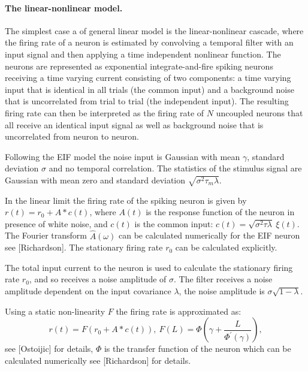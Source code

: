 \documentclass[%
 reprint,
 amsmath,amssymb,
 aps,
floatfix,
]{revtex4-1}
\begin{document}
\paragraph*{The linear-nonlinear model.}
The simplest case a of general linear model is the linear-nonlinear cascade, where the firing rate of a neuron is estimated by convolving a temporal filter with an input signal and then applying a time independent nonlinear function. The neurons are represented as exponential integrate-and-fire spiking neurons receiving a time varying current consisting of two components: a time varying input that is identical in all trials (the common input) and a background noise that is uncorrelated from trial to trial (the independent input). The resulting firing rate can then be interpreted as the firing rate of $N$ uncoupled neurons that all receive an identical input signal as well as background noise that is uncorrelated from neuron to neuron. 

Following the EIF model the noise input is Gaussian with mean $\gamma$, standard deviation $\sigma$ and no temporal correlation. The statistics of the stimulus signal are Gaussian with mean zero and standard deviation $\sqrt{\sigma^2\tau_m\lambda}$.

In the linear limit the firing rate of the spiking neuron is given by $r(t) = r_0 + A*c(t)$, where $A(t)$ is the response function of the neuron in presence of white noise, and $c(t)$ is the common input: $c(t) = \sqrt{\sigma^2 \tau \lambda}~\xi(t)$. The Fourier transform $\hat{A}(\omega)$ can be calculated numerically for the EIF neuron see [Richardson]. The stationary firing rate $r_0$ can be calculated explicitly.

The total input current to the neuron is used to calculate the stationary firing rate $r_0$, and so receives a noise amplitude of $\sigma$. The filter receives a noise amplitude dependent on the input covariance $\lambda$, the noise amplitude is $\sigma \sqrt{1-\lambda}$. \colorbox{BrickRed}{}

Using a static non-linearity $F$ the firing rate is approximated as:
\begin{equation}
r(t) = F\left(r_0+A * c(t) \right), ~F(L) = \Phi\left( \gamma + \frac{L}{\Phi^\prime(\gamma)}\right), \nonumber
\end{equation}
see [Ostoijic] for details, $\Phi$ is the transfer function of the neuron which can be calculated numerically see [Richardson] for details.
\end{document}
